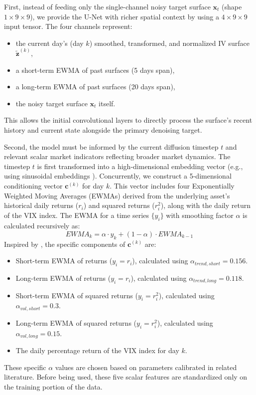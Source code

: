 \documentclass{article}
\begin{document}
First, instead of feeding only the single-channel noisy target surface $\mathbf{x}_t$ (shape $1 \times 9 \times 9$), we provide the U-Net with richer spatial context by using a $4 \times 9 \times 9$ input tensor. The four channels represent:
\begin{itemize}
    \item the current day's (day $k$) smoothed, transformed, and normalized IV surface $\tilde{\mathbf{z}}^{(k)}$,
    \item a short-term EWMA of past surfaces (5 days span),
    \item a long-term EWMA of past surfaces (20 days span),
    \item the noisy target surface $\mathbf{x}_t$ itself.
\end{itemize}
This allows the initial convolutional layers to directly process the surface's recent history and current state alongside the primary denoising target.

Second, the model must be informed by the current diffusion timestep $t$ and relevant scalar market indicators reflecting broader market dynamics. The timestep $t$ is first transformed into a high-dimensional embedding vector (e.g., using sinusoidal embeddings \citep{Vaswani_Shazeer_Parmar_Uszkoreit_Jones_Gomez_Kaiser_Polosukhin_2023}). Concurrently, we construct a 5-dimensional conditioning vector $\mathbf{c}^{(k)}$ for day $k$. This vector includes four Exponentially Weighted Moving Averages (EWMAs) derived from the underlying asset's historical daily returns ($r_i$) and squared returns ($r_i^2$), along with the daily return of the VIX index. The EWMA for a time series $\{y_i\}$ with smoothing factor $\alpha$ is calculated recursively as:
\begin{equation} \label{eq:ewma}
EWMA_k = \alpha \cdot y_k + (1 - \alpha) \cdot EWMA_{k-1}
\end{equation}
Inspired by \citep{Gazzani_Guyon_2025}, the specific components of $\mathbf{c}^{(k)}$ are:
\begin{itemize}
    \item Short-term EWMA of returns ($y_i = r_i$), calculated using $\alpha_{trend, short} = 0.156$.
    \item Long-term EWMA of returns ($y_i = r_i$), calculated using $\alpha_{trend, long} = 0.118$.
    \item Short-term EWMA of squared returns ($y_i = r_i^2$), calculated using $\alpha_{vol, short} = 0.3$.
    \item Long-term EWMA of squared returns ($y_i = r_i^2$), calculated using $\alpha_{vol, long} = 0.15$.
    \item The daily percentage return of the VIX index for day $k$.
\end{itemize}
These specific $\alpha$ values are chosen based on parameters calibrated in related literature. Before being used, these five scalar features are standardized only on the training portion of the data.
\end{document}
